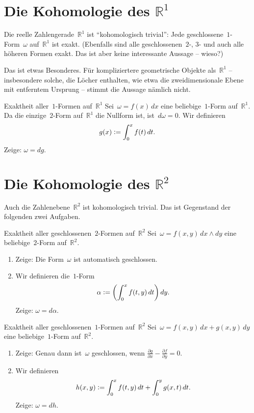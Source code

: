 \documentclass[twoside]{zirkelblatt1415}
\theoremstyle{definition}
\theoremstyle{plain}
\theoremstyle{remark}
\newcommand{\defeq}{\vcentcolon=}
\newcommand{\RR}{\mathbb{R}}
\begin{document}
\section{Die Kohomologie des $\RR^1$}

Die reelle Zahlengerade~$\RR^1$ ist "`kohomologisch trivial"': Jede
geschlossene~$1$-Form~$\omega$ auf~$\RR^1$ ist exakt. (Ebenfalls sind
alle geschlossenen~$2$-, $3$- und auch alle höheren Formen exakt. Das ist aber
keine interessante Aussage -- wieso?)

Das ist etwas Besonderes. Für kompliziertere geometrische Objekte als~$\RR^1$
-- insbesondere solche, die Löcher enthalten, wie etwa die zweidimensionale
Ebene mit entferntem Ursprung -- stimmt die Aussage nämlich nicht.

\begin{aufgabe}{Exaktheit aller~$1$-Formen auf~$\RR^1$}
Sei~$\omega = f(x)\,dx$ eine beliebige~$1$-Form auf~$\RR^1$. Da die
einzige~$2$-Form auf~$\RR^1$ die Nullform ist, ist~$d\omega = 0$. Wir
definieren
\[ g(x) \defeq \int_0^x f(t)\,dt. \]
Zeige: $\omega = dg$.
\end{aufgabe}


\section{Die Kohomologie des $\RR^2$}

Auch die Zahlenebene~$\RR^2$ ist kohomologisch trivial. Das ist Gegenstand der
folgenden zwei Aufgaben.

\begin{aufgabe}{Exaktheit aller geschlossenen~$2$-Formen auf~$\RR^2$}
Sei~$\omega = f(x,y)\,dx \wedge dy$ eine beliebige~$2$-Form auf~$\RR^2$.
\begin{enumerate}
\item Zeige: Die Form~$\omega$ ist automatisch geschlossen.
\item Wir definieren die~$1$-Form
\[ \alpha \defeq \left(\int_0^x f(t,y)\,dt\right) dy. \]
Zeige: $\omega = d\alpha$.
\end{enumerate}
\end{aufgabe}

\begin{aufgabe}{Exaktheit aller geschlossenen~$1$-Formen auf~$\RR^2$}
Sei~$\omega = f(x,y)\,dx + g(x,y)\,dy$ eine beliebige~$1$-Form auf~$\RR^2$.
\begin{enumerate}
\item Zeige: Genau dann ist~$\omega$ geschlossen, wenn
$\frac{\partial g}{\partial x} - \frac{\partial f}{\partial y} = 0$.
\item Wir definieren
\[ h(x,y) \defeq \int_0^x f(t,y)\,dt + \int_0^y g(x,t)\,dt. \]
Zeige: $\omega = dh$.
\end{enumerate}
\end{aufgabe}
\end{document}
